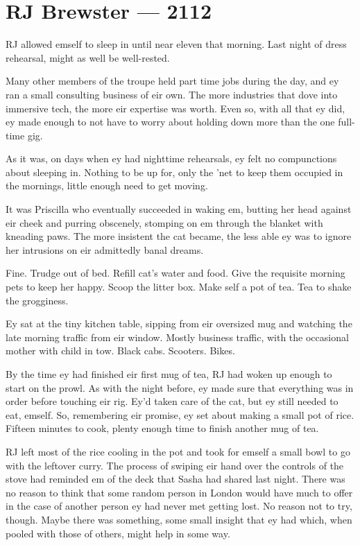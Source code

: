 \hypertarget{rj-brewster-2112}{%
\chapter*{RJ Brewster — 2112}\label{rj-brewster-2112}}

RJ allowed emself to sleep in until near eleven that morning. Last night of dress rehearsal, might as well be well-rested.

Many other members of the troupe held part time jobs during the day, and ey ran a small consulting business of eir own. The more industries that dove into immersive tech, the more eir expertise was worth. Even so, with all that ey did, ey made enough to not have to worry about holding down more than the one full-time gig.

As it was, on days when ey had nighttime rehearsals, ey felt no compunctions about sleeping in. Nothing to be up for, only the 'net to keep them occupied in the mornings, little enough need to get moving.

It was Priscilla who eventually succeeded in waking em, butting her head against eir cheek and purring obscenely, stomping on em through the blanket with kneading paws. The more insistent the cat became, the less able ey was to ignore her intrusions on eir admittedly banal dreams.

Fine. Trudge out of bed. Refill cat's water and food. Give the requisite morning pets to keep her happy. Scoop the litter box. Make self a pot of tea. Tea to shake the grogginess.

Ey sat at the tiny kitchen table, sipping from eir oversized mug and watching the late morning traffic from eir window. Mostly business traffic, with the occasional mother with child in tow. Black cabs. Scooters. Bikes.

By the time ey had finished eir first mug of tea, RJ had woken up enough to start on the prowl. As with the night before, ey made sure that everything was in order before touching eir rig. Ey'd taken care of the cat, but ey still needed to eat, emself. So, remembering eir promise, ey set about making a small pot of rice. Fifteen minutes to cook, plenty enough time to finish another mug of tea.

RJ left most of the rice cooling in the pot and took for emself a small bowl to go with the leftover curry. The process of swiping eir hand over the controls of the stove had reminded em of the deck that Sasha had shared last night. There was no reason to think that some random person in London would have much to offer in the case of another person ey had never met getting lost. No reason not to try, though. Maybe there was something, some small insight that ey had which, when pooled with those of others, might help in some way.

